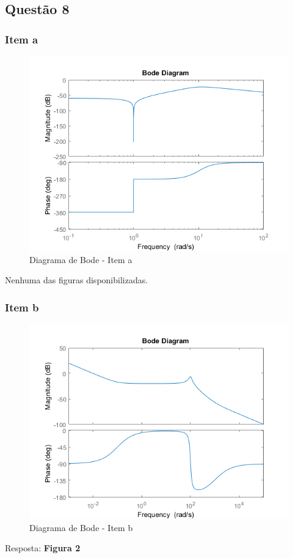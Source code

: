 \documentclass[a4paper, 12pt]{article}
\begin{document}
    \subsection{Quest\~{a}o 8}
        \subsubsection{Item a}
		\begin{figure}[!ht]
			\centering
			\includegraphics{img/Q8a.png}
			\caption{Diagrama de Bode - Item a}	
		\end{figure}           
		Nenhuma das figuras disponibilizadas.
		\newpage
        \subsubsection{Item b}
		\begin{figure}[!ht]
			\centering
			\includegraphics{img/Q8b.png}
			\caption{Diagrama de Bode - Item b}	
		\end{figure}           
		Resposta: \textbf{Figura 2}
		\newpage
\end{document}
